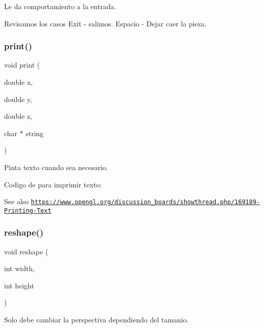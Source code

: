 Le da comportamiento a la entrada. 

Revisamos los casos Exit -\/ salimos. Espacio -\/ Dejar caer la pieza. \mbox{\label{interfaz-grafica_8c_aa50584771327fb90979684f968197158}} 
\subsubsection{\texorpdfstring{print()}{print()}}
{\footnotesize\ttfamily void print (\begin{DoxyParamCaption}\item[{double}]{x,  }\item[{double}]{y,  }\item[{double}]{z,  }\item[{char $\ast$}]{string }\end{DoxyParamCaption})}



Pinta texto cuando sea necesario. 

Codigo de para imprimir texto\+: \begin{DoxySeeAlso}{See also}
\href{https://www.opengl.org/discussion_boards/showthread.php/169189-Printing-Text}{\tt https\+://www.\+opengl.\+org/discussion\+\_\+boards/showthread.\+php/169189-\/\+Printing-\/\+Text} 
\end{DoxySeeAlso}
\mbox{\label{interfaz-grafica_8c_a6819355374dd277347abd7c4235f0cd7}} 
\subsubsection{\texorpdfstring{reshape()}{reshape()}}
{\footnotesize\ttfamily void reshape (\begin{DoxyParamCaption}\item[{int}]{width,  }\item[{int}]{height }\end{DoxyParamCaption})}

Solo debe cambiar la perspectiva dependiendo del tamanio. \mbox{\label{interfaz-grafica_8c_af3f54b3a1f56ec2bbffb19f34137f55e}} 
